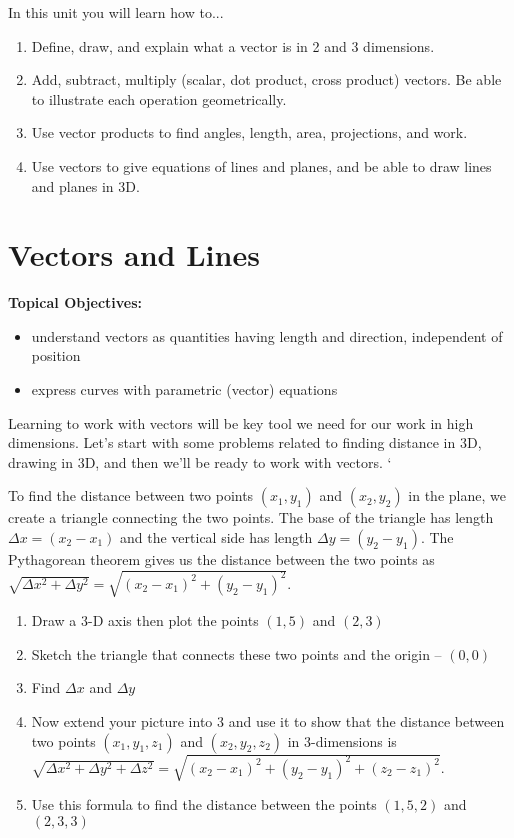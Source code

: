 
\noindent 
In this unit you will learn how to...
\begin{enumerate}
\item Define, draw, and explain what a vector is in 2 and 3 dimensions.
\item Add, subtract, multiply (scalar, dot product, cross product) vectors. Be able to illustrate each operation geometrically.
\item Use vector products to find angles, length, area, projections, and work.
\item Use vectors to give equations of lines and planes, and be able to draw lines and planes in 3D.
\end{enumerate}

\normalsize
\section{Vectors and Lines}
\textbf{Topical Objectives:}
\begin{itemize}
\item understand vectors as quantities having length and direction, independent of position
\item express curves with parametric (vector) equations
\end{itemize}

Learning to work with vectors will be key tool we need for our work in high dimensions.  Let's start with some problems related to finding distance in 3D, drawing in 3D, and then we'll be ready to work with vectors.
`

\begin{problem}
To find the distance between two points $(x_1,y_1)$ and $(x_2,y_2)$ in the plane, we create a triangle connecting the two points.  The base of the triangle has length $\Delta x=(x_2-x_1)$ and the vertical side has length $\Delta y=(y_2-y_1)$. The Pythagorean theorem gives us the distance between the two points as $\sqrt{\Delta x^2+\Delta y^2}=\sqrt{(x_2-x_1)^2+(y_2-y_1)^2}$.\\

\begin{enumerate}
\item Draw a 3-D axis then plot the points $(1,5)$ and $(2,3)$
\item Sketch the triangle that connects these two points and the origin -- $(0,0)$
\item Find $\Delta x$ and $\Delta y$
\item Now extend your picture into 3 and use it to show that the distance between two points $(x_1,y_1,z_1)$ and $(x_2,y_2,z_2)$ in 3-dimensions is $\sqrt{\Delta x^2+\Delta y^2+\Delta z^2}=\sqrt{(x_2-x_1)^2+(y_2-y_1)^2+(z_2-z_1)^2}$.
\item Use this formula to find the distance between the points $(1,5,2)$ and $(2,3,3)$
\end{enumerate}
\end{problem}


